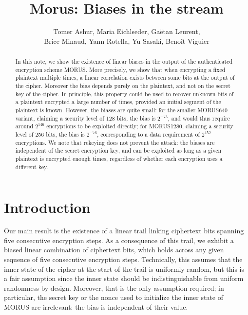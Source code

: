 \documentclass{llncs}
\author{}
\institute{}
\author{Tomer Ashur, Maria Eichlseder, Ga\"etan Leurent,\\Brice Minaud, Yann Rotella, Yu Sasaki, Beno\^it Viguier}
\institute{}
\begin{document}
\mainmatter

\title{Morus: Biases in the stream}

\maketitle

\begin{abstract}
In this note, we show the existence of linear biases in the output of the authenticated encryption scheme MORUS. More precisely, we show that when encrypting a fixed plaintext multiple times, a linear correlation exists between some bits at the output of the cipher. Moreover the bias depends purely on the plaintext, and not on the secret key of the cipher. In principle, this property could be used to recover unknown bits of a plaintext encrypted a large number of times, provided an initial segment of the plaintext is known. However, the biases are quite small: for the smaller MORUS640 variant, claiming a security level of 128 bits, the bias is $2^{-73}$, and would thus require around $2^{146}$ encryptions to be exploited directly; for MORUS1280, claiming a security level of 256 bits, the bias is $2^{-76}$, corresponding to a data requirement of $2^{152}$ encryptions. We note that rekeying does not prevent the attack: the biases are independent of the secret encryption key, and can be exploited as long as a given plaintext is encrypted enough times, regardless of whether each encryption uses a different key.
\end{abstract}

\section{Introduction}

Our main result is the existence of a linear trail linking ciphertext bits spanning five consecutive encryption steps. As a consequence of this trail, we exhibit a biased linear combination of ciphertext bits, which holds across any given sequence of five consecutive encryption steps. Technically, this assumes that the inner state of the cipher at the start of the trail is uniformly random, but this is a fair assumption since the inner state should be indistinguishable from uniform randomness by design. Moreover, that is the only assumption required; in particular, the secret key or the nonce used to initialize the inner state of MORUS are irrelevant: the bias is independent of their value.
\end{document}
